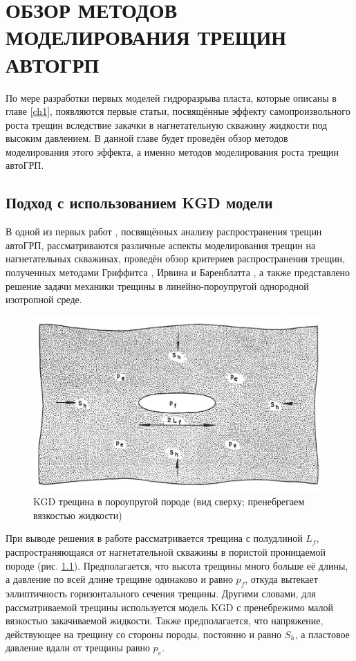 \chapter{ОБЗОР МЕТОДОВ МОДЕЛИРОВАНИЯ ТРЕЩИН АВТОГРП} \label{ch2}

По мере разработки первых моделей гидроразрыва пласта, которые описаны в главе \ref{ch1}, появляются первые статьи, посвящённые эффекту самопроизвольного роста трещин вследствие закачки в нагнетательную скважину жидкости под высоким давлением.
В данной главе будет проведён обзор методов моделирования этого эффекта, а именно методов моделирования роста трещин автоГРП.

\section{Подход с использованием KGD модели}
\vspace*{-5mm}

В одной из первых работ \cite{hagoort_phd}, посвящённых анализу распространения трещин автоГРП, рассматриваются различные аспекты моделирования трещин на нагнетательных скважинах, проведён обзор критериев распространения трещин, полученных методами Гриффитса \cite{griffith}, Ирвина \cite{irwin} и Баренблатта \cite{barenblatt}, а также представлено решение задачи механики трещины в линейно-пороупругой однородной изотропной среде.

\begin{figure}[H] 
\center
\includegraphics[width=.55\linewidth]{images/Hagoort_model_scheme.jpg}
\caption{KGD трещина в пороупругой породе \cite{hagoort_phd} (вид сверху; пренебрегаем вязкостью жидкости)} 
\label{fig:hagoort_model_scheme}  
\end{figure}

При выводе решения в работе \cite{hagoort_phd} рассматривается трещина с полудлиной $L_{\!f}$, распространяющаяся от нагнетательной скважины в пористой проницаемой породе (рис. \ref{fig:hagoort_model_scheme}).
Предполагается, что высота трещины много больше её длины, а давление по всей длине трещине одинаково и равно $p_{\!f}$, откуда вытекает эллиптичность горизонтального сечения трещины.
Другими словами, для рассматриваемой трещины используется модель KGD с пренебрежимо малой вязкостью закачиваемой жидкости.
Также предполагается, что напряжение, действующее на трещину со стороны породы, постоянно и равно $S_h$, а пластовое давление вдали от трещины равно $p_e$.

